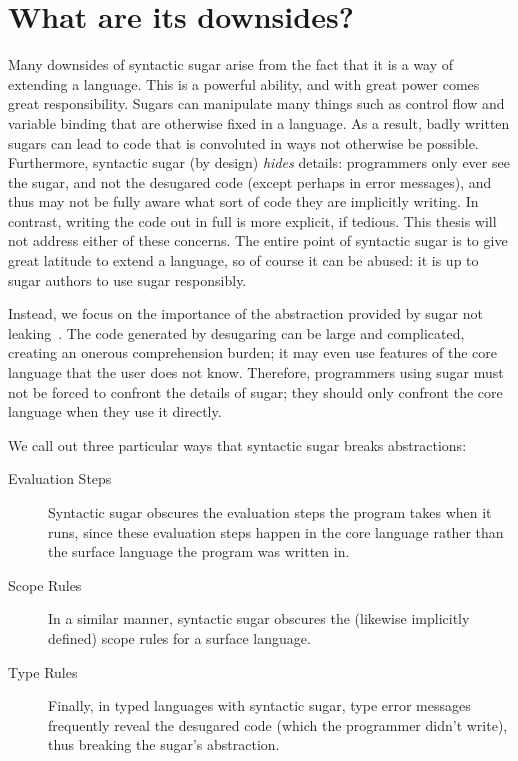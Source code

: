 \section{What are its downsides?}

Many downsides of syntactic sugar arise from the fact that it is a way
of extending a language. This is a powerful ability, and with great
power comes great responsibility. Sugars can manipulate many things
such as control flow and variable binding that are otherwise fixed in
a language. As a result, badly written sugars can lead to code that is
convoluted in ways not otherwise be possible.  Furthermore, syntactic
sugar (by design) \emph{hides} details: programmers only ever see the
sugar, and not the desugared code (except perhaps in error messages),
and thus may not be fully aware what sort of code they are implicitly
writing. In contrast, writing the code out in full is more explicit,
if tedious.  This thesis will not address either of these concerns.
The entire point of syntactic sugar is to give great latitude to
extend a language, so of course it can be abused: it is up to sugar
authors to use sugar responsibly.

Instead, we focus on the importance of the abstraction
provided by sugar not leaking~\cite{leaky-abstractions}.  The code
generated by desugaring can be large and complicated, creating an
onerous comprehension burden; it may even use features of the core
language that the user does not know. Therefore, programmers using
sugar must not be forced to confront the details of sugar; they should
only confront the core language when they use it directly.

We call out three particular ways that syntactic sugar breaks abstractions:

\begin{description}
\item[Evaluation Steps] Syntactic sugar obscures the evaluation steps
  the program takes when it runs, since these evaluation steps happen
  in the core language rather than the surface language the program
  was written in.
\item[Scope Rules] In a similar manner, syntactic sugar obscures the
  (likewise implicitly defined) scope rules for a surface language.
\item[Type Rules] Finally, in typed languages with syntactic sugar,
  type error messages frequently reveal the desugared code (which the
  programmer didn't write), thus breaking the sugar's abstraction.
\end{description}

